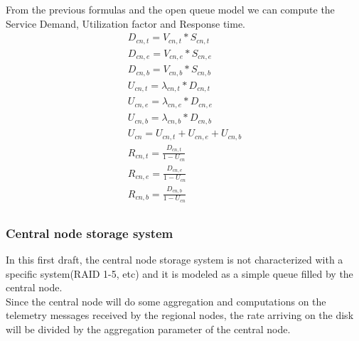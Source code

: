 \documentclass[11pt]{article}
\begin{document}
From the previous formulas and the open queue model we can compute the Service Demand, Utilization factor and Response time.
\begin{equation}
	\begin{array}{l}
		D_{cn, t} = V_{cn, t} * S_{cn, t} \\
		D_{cn, e} = V_{cn, e} * S_{cn, e} \\
		D_{cn, b} = V_{cn, b} * S_{cn, b} \\
		U_{cn, t} = \lambda_{cn, t} * D_{cn, t} \\
		U_{cn, e} = \lambda_{cn, e} * D_{cn, e} \\
		U_{cn, b} = \lambda_{cn, b} * D_{cn, b} \\
		U_{cn} = U_{cn, t} + U_{cn, e} + U_{cn, b} \\
		R_{cn, t} = \frac{D_{cn, t}}{1 - U_{cn}} \\
		R_{cn, e} = \frac{D_{cn, e}}{1 - U_{cn}} \\
		R_{cn, b} = \frac{D_{cn, b}}{1 - U_{cn}} \\
	\end{array}
\end{equation}

\subsubsection{Central node storage system}
In this first draft, the central node storage system is not characterized with a specific system(RAID 1-5, etc) and it is modeled as a simple queue filled by the central node.\\
Since the central node will do some aggregation and computations on the telemetry messages received by the regional nodes, the rate arriving on the disk will be divided by the aggregation parameter of the central node.\\
\end{document}

